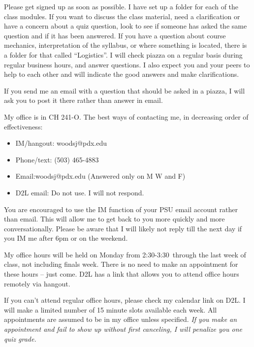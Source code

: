 \documentclass[letterpaper,10pt]{article}
\newcommand{\Office}{on Monday from 2:30-3:30}
\begin{document}
Please get signed up as soon as possible. I have set up a
folder for each of the class modules. If you want to discuss the class material, need a clarification or have a concern about a quiz question, look to see if someone has asked the same question and if it has been answered. 
If you have a question about course mechanics, interpretation of the
syllabus, or where something is located, there is a folder for
that called ``Logistics''. I will check piazza on a regular basis during regular business hours, and answer questions. I also expect you and your peers to help to each other and will indicate the good answers and make clarifications.  

If you send me an email with a question that should be asked in a piazza, I
will ask you to post it there rather than answer in email.


 
My office is in CH 241-O.  The best ways of contacting me, in
decreasing order of effectiveness:
\begin{itemize}
\item IM/hangout: woodsj@pdx.edu
\item Phone/text: (503) 465-4883
\item Email:woodsj@pdx.edu (Answered only on M W and F)
\item D2L email: Do not use.  I will not respond.
\end{itemize}

You are encouraged to use the IM function of your PSU email account rather than email. This will allow me to get back to you more quickly and more conversationally. Please be aware that I will likely not reply till the next day if you IM me after 6pm or on the weekend.  

My office hours will be held \Office ~through the last week of class, not including finals week. There is no need to make an appointment for these hours -- just come.  D2L has a link that allows you to attend office hours remotely via hangout.



If you can't attend regular office hours, please check my calendar link on D2L. I will make a limited number of 15 minute slots available each week. All appointments are assumed to be in my office unless specified.  \emph{If you make an appointment and fail to show up without first canceling, I will penalize you one quiz grade.}  
\end{document}
